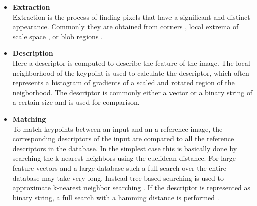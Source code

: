 \documentclass[10pt,a4paper]{article}
\begin{document}
\begin{itemize}
	\item \textbf{Extraction}\\
Extraction is the process of finding pixels that have a significant and distinct appearance. Commonly they are obtained from corners \autocite{harris_corner, fast1}, local extrema of scale space \autocite{lowe_sift}, or blob regions \autocite{donoser2006mser}.
	\item \textbf{Description}\\
Here a descriptor is computed to describe the feature of the image. The local neighborhood of the keypoint is used to calculate the descriptor, which often represents a histogram of gradients of a scaled and rotated region of the neigborhood. The descriptor is commonly either a vector \autocite{lowe_sift,surf} or a binary string \cite{calonder2010brief,orb} of a certain size and is used for comparison.
	\item \textbf{Matching}\\
To match keypoints between an input and an a reference image, the corresponding descriptors of the input are compared to all the reference descriptors in the database. In the simplest case this is basically done by searching the k-nearest neighbors using the euclidean distance. For large feature vectors and a large database such a full search over the entire database may take very long. Instead tree based searching is used to approximate k-nearest neighbor searching \autocite{arya_search}. If the descriptor is represented as binary string, a full search with a hamming distance is performed \autocite{calonder2010brief}. 
\end{itemize}
\end{document}
